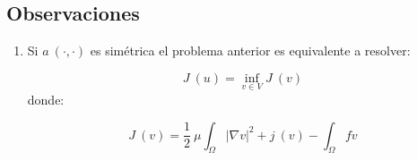 \subsection{Observaciones}

\begin{enumerate}
\item Si $a\ (\cdot ,\cdot )$ es sim\'etrica el problema anterior es equivalente
a resolver:

\begin{displaymath}
J\ (u) =\inf_{v\in V} J\ (v)
\end{displaymath}
donde:

\begin{displaymath} 
J\ (v) = \frac{1}{2}\ \mu \int_{\Omega }|\nabla v|^2+j\ (v)-\int_{\Omega} fv
\end{displaymath}
\end{enumerate}
